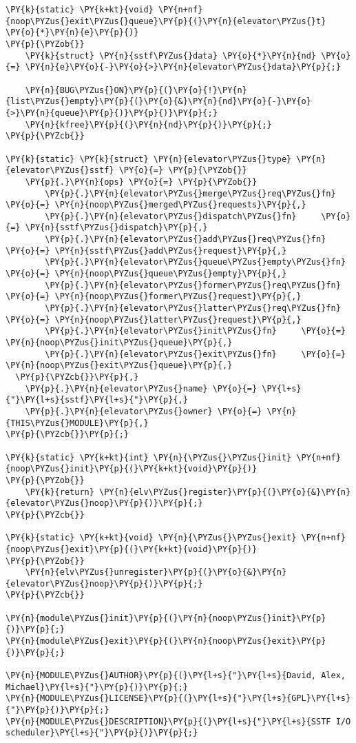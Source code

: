 \begin{Verbatim}[commandchars=\\\{\}]
\PY{k}{static} \PY{k+kt}{void} \PY{n+nf}{noop\PYZus{}exit\PYZus{}queue}\PY{p}{(}\PY{n}{elevator\PYZus{}t} \PY{o}{*}\PY{n}{e}\PY{p}{)}
\PY{p}{\PYZob{}}
	\PY{k}{struct} \PY{n}{sstf\PYZus{}data} \PY{o}{*}\PY{n}{nd} \PY{o}{=} \PY{n}{e}\PY{o}{-}\PY{o}{>}\PY{n}{elevator\PYZus{}data}\PY{p}{;}

	\PY{n}{BUG\PYZus{}ON}\PY{p}{(}\PY{o}{!}\PY{n}{list\PYZus{}empty}\PY{p}{(}\PY{o}{&}\PY{n}{nd}\PY{o}{-}\PY{o}{>}\PY{n}{queue}\PY{p}{)}\PY{p}{)}\PY{p}{;}
	\PY{n}{kfree}\PY{p}{(}\PY{n}{nd}\PY{p}{)}\PY{p}{;}
\PY{p}{\PYZcb{}}

\PY{k}{static} \PY{k}{struct} \PY{n}{elevator\PYZus{}type} \PY{n}{elevator\PYZus{}sstf} \PY{o}{=} \PY{p}{\PYZob{}}
	\PY{p}{.}\PY{n}{ops} \PY{o}{=} \PY{p}{\PYZob{}}
		\PY{p}{.}\PY{n}{elevator\PYZus{}merge\PYZus{}req\PYZus{}fn}		\PY{o}{=} \PY{n}{noop\PYZus{}merged\PYZus{}requests}\PY{p}{,}
		\PY{p}{.}\PY{n}{elevator\PYZus{}dispatch\PYZus{}fn}		\PY{o}{=} \PY{n}{sstf\PYZus{}dispatch}\PY{p}{,}
		\PY{p}{.}\PY{n}{elevator\PYZus{}add\PYZus{}req\PYZus{}fn}		\PY{o}{=} \PY{n}{sstf\PYZus{}add\PYZus{}request}\PY{p}{,}
		\PY{p}{.}\PY{n}{elevator\PYZus{}queue\PYZus{}empty\PYZus{}fn}	\PY{o}{=} \PY{n}{noop\PYZus{}queue\PYZus{}empty}\PY{p}{,}
		\PY{p}{.}\PY{n}{elevator\PYZus{}former\PYZus{}req\PYZus{}fn}		\PY{o}{=} \PY{n}{noop\PYZus{}former\PYZus{}request}\PY{p}{,}
		\PY{p}{.}\PY{n}{elevator\PYZus{}latter\PYZus{}req\PYZus{}fn}		\PY{o}{=} \PY{n}{noop\PYZus{}latter\PYZus{}request}\PY{p}{,}
		\PY{p}{.}\PY{n}{elevator\PYZus{}init\PYZus{}fn}		\PY{o}{=} \PY{n}{noop\PYZus{}init\PYZus{}queue}\PY{p}{,}
		\PY{p}{.}\PY{n}{elevator\PYZus{}exit\PYZus{}fn}		\PY{o}{=} \PY{n}{noop\PYZus{}exit\PYZus{}queue}\PY{p}{,}
  \PY{p}{\PYZcb{}}\PY{p}{,}
	\PY{p}{.}\PY{n}{elevator\PYZus{}name} \PY{o}{=} \PY{l+s}{"}\PY{l+s}{sstf}\PY{l+s}{"}\PY{p}{,}
	\PY{p}{.}\PY{n}{elevator\PYZus{}owner} \PY{o}{=} \PY{n}{THIS\PYZus{}MODULE}\PY{p}{,}
\PY{p}{\PYZcb{}}\PY{p}{;}

\PY{k}{static} \PY{k+kt}{int} \PY{n}{\PYZus{}\PYZus{}init} \PY{n+nf}{noop\PYZus{}init}\PY{p}{(}\PY{k+kt}{void}\PY{p}{)}
\PY{p}{\PYZob{}}
	\PY{k}{return} \PY{n}{elv\PYZus{}register}\PY{p}{(}\PY{o}{&}\PY{n}{elevator\PYZus{}noop}\PY{p}{)}\PY{p}{;}
\PY{p}{\PYZcb{}}

\PY{k}{static} \PY{k+kt}{void} \PY{n}{\PYZus{}\PYZus{}exit} \PY{n+nf}{noop\PYZus{}exit}\PY{p}{(}\PY{k+kt}{void}\PY{p}{)}
\PY{p}{\PYZob{}}
	\PY{n}{elv\PYZus{}unregister}\PY{p}{(}\PY{o}{&}\PY{n}{elevator\PYZus{}noop}\PY{p}{)}\PY{p}{;}
\PY{p}{\PYZcb{}}

\PY{n}{module\PYZus{}init}\PY{p}{(}\PY{n}{noop\PYZus{}init}\PY{p}{)}\PY{p}{;}
\PY{n}{module\PYZus{}exit}\PY{p}{(}\PY{n}{noop\PYZus{}exit}\PY{p}{)}\PY{p}{;}

\PY{n}{MODULE\PYZus{}AUTHOR}\PY{p}{(}\PY{l+s}{"}\PY{l+s}{David, Alex, Michael}\PY{l+s}{"}\PY{p}{)}\PY{p}{;}
\PY{n}{MODULE\PYZus{}LICENSE}\PY{p}{(}\PY{l+s}{"}\PY{l+s}{GPL}\PY{l+s}{"}\PY{p}{)}\PY{p}{;}
\PY{n}{MODULE\PYZus{}DESCRIPTION}\PY{p}{(}\PY{l+s}{"}\PY{l+s}{SSTF I/O scheduler}\PY{l+s}{"}\PY{p}{)}\PY{p}{;}
\end{Verbatim}
